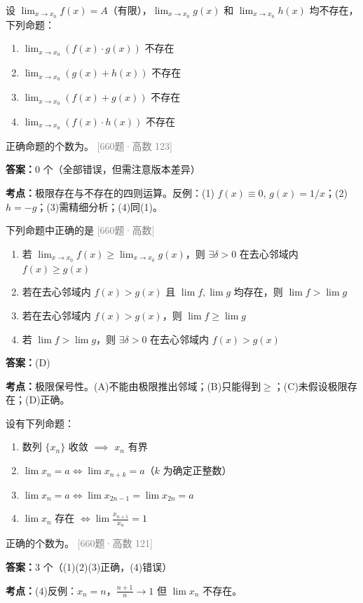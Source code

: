 \documentclass[12pt,a4paper]{ctexbook}
\newcommand{\src}[1]{\hfill\textcolor{gray}{\small\textsf{[#1]}}}
\newcommand{\ans}[1]{\begin{answerbox}\textbf{答案：}#1\end{answerbox}}
\newcommand{\kpt}[1]{\textbf{考点：}#1}
\begin{document}
\begin{exercise}[660题·极限不存在时的四则运算]
设 $\displaystyle\lim_{x\to x_0}f(x)=A$（有限），$\displaystyle\lim_{x\to x_0}g(x)$ 和 $\displaystyle\lim_{x\to x_0}h(x)$ 均不存在，下列命题：
\begin{enumerate}[label=(\arabic*),nosep]
  \item $\displaystyle\lim_{x\to x_0}(f(x)\cdot g(x))$ 不存在
  \item $\displaystyle\lim_{x\to x_0}(g(x)+h(x))$ 不存在
  \item $\displaystyle\lim_{x\to x_0}(f(x)+g(x))$ 不存在
  \item $\displaystyle\lim_{x\to x_0}(f(x)\cdot h(x))$ 不存在
\end{enumerate}
正确命题的个数为\underline{\hspace{1cm}}。
\src{660题·高数 123}
\end{exercise}
\ans{0 个（全部错误，但需注意版本差异）}
\kpt{极限存在与不存在的四则运算。反例：(1) $f(x)\equiv 0$, $g(x)=1/x$；(2) $h=-g$；(3)需精细分析；(4)同(1)。}

\bigskip

\begin{exercise}[660题·极限保号性]
下列命题中正确的是 \hfill\src{660题·高数}
\begin{enumerate}[label=(\Alph*),nosep]
  \item 若 $\lim_{x\to x_0}f(x)\geqslant\lim_{x\to x_0}g(x)$，则 $\exists\delta>0$ 在去心邻域内 $f(x)\geqslant g(x)$
  \item 若在去心邻域内 $f(x)>g(x)$ 且 $\lim f,\lim g$ 均存在，则 $\lim f>\lim g$
  \item 若在去心邻域内 $f(x)>g(x)$，则 $\lim f\geqslant\lim g$
  \item 若 $\lim f>\lim g$，则 $\exists\delta>0$ 在去心邻域内 $f(x)>g(x)$
\end{enumerate}
\end{exercise}
\ans{(D)}
\kpt{极限保号性。(A)不能由极限推出邻域；(B)只能得到$\geqslant$；(C)未假设极限存在；(D)正确。}

\bigskip

\begin{exercise}[660题·数列收敛等价条件]
设有下列命题：
\begin{enumerate}[label=(\arabic*),nosep]
  \item 数列 $\{x_n\}$ 收敛 $\implies$ $x_n$ 有界
  \item $\lim x_n=a \iff \lim x_{n+k}=a$（$k$ 为确定正整数）
  \item $\lim x_n=a \iff \lim x_{2n-1}=\lim x_{2n}=a$
  \item $\lim x_n$ 存在 $\iff \lim\frac{x_{n+1}}{x_n}=1$
\end{enumerate}
正确的个数为\underline{\hspace{1cm}}。
\src{660题·高数 121}
\end{exercise}
\ans{3 个（(1)(2)(3)正确，(4)错误）}
\kpt{(4)反例：$x_n=n$，$\frac{n+1}{n}\to 1$ 但 $\lim x_n$ 不存在。}
\end{document}

